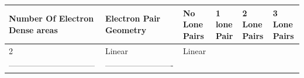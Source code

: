 \documentclass[]{article}
\begin{document}
\begin{longtable}[]{@{}llllll@{}}
\toprule
\begin{minipage}[b]{0.20\columnwidth}\raggedright\strut
Number Of Electron Dense areas\strut
\end{minipage} & \begin{minipage}[b]{0.16\columnwidth}\raggedright\strut
Electron Pair Geometry\strut
\end{minipage} & \begin{minipage}[b]{0.14\columnwidth}\raggedright\strut
No Lone Pairs\strut
\end{minipage} & \begin{minipage}[b]{0.15\columnwidth}\raggedright\strut
1 lone Pair\strut
\end{minipage} & \begin{minipage}[b]{0.10\columnwidth}\raggedright\strut
2 Lone Pairs\strut
\end{minipage} & \begin{minipage}[b]{0.09\columnwidth}\raggedright\strut
3 Lone Pairs\strut
\end{minipage}\tabularnewline
\midrule
\endhead
\begin{minipage}[t]{0.20\columnwidth}\raggedright\strut
2\strut
\end{minipage} & \begin{minipage}[t]{0.16\columnwidth}\raggedright\strut
Linear\strut
\end{minipage} & \begin{minipage}[t]{0.14\columnwidth}\raggedright\strut
Linear\strut
\end{minipage} & \begin{minipage}[t]{0.15\columnwidth}\raggedright\strut
\strut
\end{minipage} & \begin{minipage}[t]{0.10\columnwidth}\raggedright\strut
\strut
\end{minipage} & \begin{minipage}[t]{0.09\columnwidth}\raggedright\strut
\strut
\end{minipage}\tabularnewline
\begin{minipage}[t]{0.20\columnwidth}\raggedright\strut
--------------------------------\strut
\end{minipage} & \begin{minipage}[t]{0.16\columnwidth}\raggedright\strut
-------------------------\strut
\end{minipage} & \begin{minipage}[t]{0.14\columnwidth}\raggedright\strut

\end{minipage}
\end{longtable}
\end{document}
